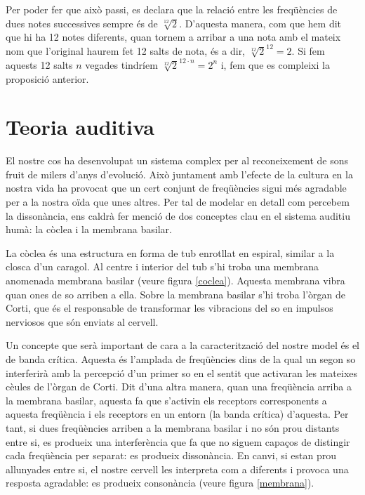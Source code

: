 \documentclass{article}
\theoremstyle{definition}
\begin{document}
Per poder fer que això passi, es declara que la relació entre les freqüències de dues notes successives sempre és de $\sqrt[12]{2}$\footnotemark\space. D'aquesta manera, com que hem dit que hi ha 12 notes diferents, quan tornem a arribar a una nota amb el mateix nom que l'original haurem fet 12 salts de nota, és a dir, $\sqrt[12]{2}^{12} = 2$. Si fem aquests 12 salts $n$ vegades tindríem $\sqrt[12]{2}^{12\cdot n} = 2^n$ i, fem que es compleixi la proposició anterior.
\section{Teoria auditiva}\label{teoria_auditiva}
El nostre cos ha desenvolupat un sistema complex per al reconeixement de sons fruit de milers d'anys d'evolució. Això juntament amb l'efecte de la cultura en la nostra vida ha provocat que un cert conjunt de freqüències sigui més agradable per a la nostra oïda que unes altres. Per tal de modelar en detall com percebem la dissonància, ens caldrà fer menció de dos conceptes clau en el sistema auditiu humà: la còclea i la membrana basilar. \par
La còclea és una estructura en forma de tub enrotllat en espiral, similar a la closca d'un caragol. Al centre i interior del tub s'hi troba una membrana anomenada membrana basilar (veure figura \ref{coclea}). Aquesta membrana vibra quan ones de so arriben a ella. Sobre la membrana basilar s'hi troba l'òrgan de Corti, que és el responsable de transformar les vibracions del so en impulsos nerviosos que són enviats al cervell.\par
Un concepte que serà important de cara a la caracterització del nostre model és el de banda crítica. Aquesta és l'amplada de freqüències dins de la qual un segon so interferirà amb la percepció d'un primer so en el sentit que activaran les mateixes cè\lgem ules de l'òrgan de Corti. Dit d'una altra manera, quan una freqüència arriba a la membrana basilar, aquesta fa que s'activin els receptors corresponents a aquesta freqüència i els receptors en un entorn (la banda crítica) d'aquesta. Per tant, si dues freqüències arriben a la membrana basilar i no són prou distants entre si, es produeix una interferència que fa que no siguem capaços de distingir cada freqüència per separat: es produeix dissonància. En canvi, si estan prou allunyades entre si, el nostre cervell les interpreta com a diferents i provoca una resposta agradable: es produeix consonància (veure figura \ref{membrana}).\par
\end{document}
